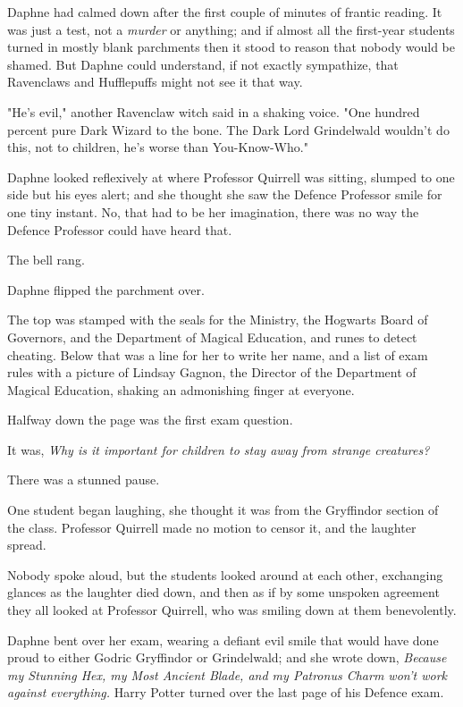 Daphne had calmed down after the first couple of minutes of frantic reading. It
was just a test, not a \emph{murder} or anything; and if almost all the
first-year students turned in mostly blank parchments then it stood to reason
that nobody would be shamed. But Daphne could understand, if not exactly
sympathize, that Ravenclaws and Hufflepuffs might not see it that way.

"He's evil," another Ravenclaw witch said in a shaking voice. "One hundred
percent pure Dark Wizard to the bone. The Dark Lord Grindelwald wouldn't do
this, not to children, he's worse than You-Know-Who."

Daphne looked reflexively at where Professor Quirrell was sitting, slumped to
one side but his eyes alert; and she thought she saw the Defence Professor
smile for one tiny instant. No, that had to be her imagination, there was no
way the Defence Professor could have heard that.

The bell rang.

Daphne flipped the parchment over.

The top was stamped with the seals for the Ministry, the Hogwarts Board of
Governors, and the Department of Magical Education, and runes to detect
cheating. Below that was a line for her to write her name, and a list of exam
rules with a picture of Lindsay Gagnon, the Director of the Department of
Magical Education, shaking an admonishing finger at everyone.

Halfway down the page was the first exam question.

It was, \emph{Why is it important for children to stay away from strange
creatures?}

There was a stunned pause.

One student began laughing, she thought it was from the Gryffindor section of
the class. Professor Quirrell made no motion to censor it, and the laughter
spread.

Nobody spoke aloud, but the students looked around at each other, exchanging
glances as the laughter died down, and then as if by some unspoken agreement
they all looked at Professor Quirrell, who was smiling down at them
benevolently.

Daphne bent over her exam, wearing a defiant evil smile that would have done
proud to either Godric Gryffindor or Grindelwald; and she wrote down,
\emph{Because my Stunning Hex, my Most Ancient Blade, and my Patronus Charm
won't work against everything.}
\later
Harry Potter turned over the last page of his Defence exam.

